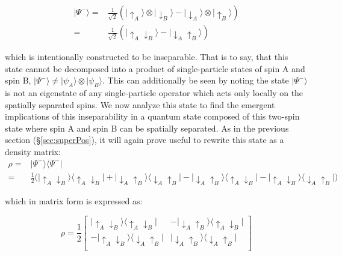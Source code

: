 \begin{equation}
\begin{aligned}
|\Psi^-\rangle = &\frac{1}{\sqrt{2}} \left (  | \uparrow_A \rangle \otimes | \downarrow_B \rangle - | \downarrow_A \rangle \otimes | \uparrow_B \rangle \right ) \\
 = & \frac{1}{\sqrt{2}} \left (  | \uparrow_A \downarrow_B\rangle - | \downarrow_A \uparrow_B \rangle \right )
\end{aligned}
\label{eqn:bellState}
\end{equation}

which is intentionally constructed to be inseparable. That is to say, that this state cannot be decomposed into a product of single-particle states of spin A and spin B, $|\Psi^-\rangle \neq |\psi_A\rangle \otimes |\psi_B\rangle$. This can additionally be seen by noting the state $| \Psi^- \rangle$ is not an eigenstate of any single-particle operator which acts only locally on the spatially separated spins. We now analyze this state to find the emergent implications of this inseparability in a quantum state composed of this two-spin state where spin A and spin B can be spatially separated. As in the previous section (\S \ref{sec:superPos}), it will again prove useful to rewrite this state as a density matrix:
\begin{equation}
\begin{aligned}
\rho =  & | \Psi^- \rangle \langle \Psi^- | \\
 = & \frac{1}{2}  \Big ( | \uparrow_A \downarrow_B\rangle \langle \uparrow_A \downarrow_B | + | \downarrow_A \uparrow_B\rangle \langle \downarrow_A \uparrow_B |  - | \downarrow_A \uparrow_B\rangle \langle \uparrow_A \downarrow_B |  -
| \uparrow_A \downarrow_B\rangle \langle \downarrow_A \uparrow_B |
 \Big ) 
 \end{aligned}
 \label{eqn:bellRho}
\end{equation}

which in matrix form is expressed as:

\[
\rho = \frac{1}{2} \begin{bmatrix}
| \uparrow_A \downarrow_B \rangle \langle \uparrow_A \downarrow_B | & -| \downarrow_A \uparrow_B \rangle \langle \uparrow_A \downarrow_B |  \\
-| \uparrow_A \downarrow_B \rangle \langle \downarrow_A \uparrow_B|  & | \downarrow_A \uparrow_B \rangle \langle \downarrow_A \uparrow_B | \\
\end{bmatrix}
\]

